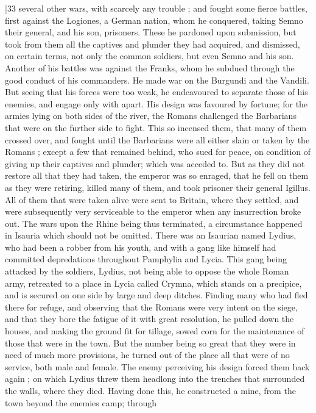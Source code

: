 |33 several other wars, with scarcely any trouble ; and fought some fierce battles, first against the Logiones, a German nation, whom he conquered, taking Semno their general, and his son, prisoners. These he pardoned upon submission, but took from them all the captives and plunder they had acquired, and dismissed, on certain terms, not only the common soldiers, but even Semno and his son. Another of his battles was against the Franks, whom he subdued through the good conduct of his commanders. He made war on the Burgundi and the Vandili. But seeing that his forces were too weak, he endeavoured to separate those of his enemies, and engage only with apart. His design was favoured by fortune; for the armies lying on both sides of the river, the Romans challenged the Barbarians that were on the further side to fight. This so incensed them, that many of them crossed over, and fought until the Barbarians were all either slain or taken by the Romans ; except a few that remained behind, who sued for peace, on condition of giving up their captives and plunder; which was acceded to. But as they did not restore all that they had taken, the emperor was so enraged, that he fell on them as they were retiring, killed many of them, and took prisoner their general Igillus. All of them that were taken alive were sent to Britain, where they settled, and were subsequently very serviceable to the emperor when any insurrection broke out. The wars upon the Rhine being thus terminated, a circumstance happened in Isauria which should not be omitted. There was an Isaurian named Lydius, who had been a robber from his youth, and with a gang like himself had committed depredations throughout Pamphylia and Lycia. This gang being attacked by the soldiers, Lydius, not being able to oppose the whole Roman army, retreated to a place in Lycia called Crymna, which stands on a precipice, and is secured on one side by large and deep ditches. Finding many who had fled there for refuge, and observing that the Romans were very intent on the siege, and that they bore the fatigue of it with great resolution, he pulled down the houses, and making the ground fit for tillage, sowed corn for the maintenance of those that were in the town. But the number being so great that they were in need of much more provisions, he turned out of the place all that were of no service, both male and female. The enemy perceiving his design forced them back again ; on which Lydius threw them headlong into the trenches that surrounded the walls, where they died. Having done this, he constructed a mine, from the town beyond the enemies camp; through
